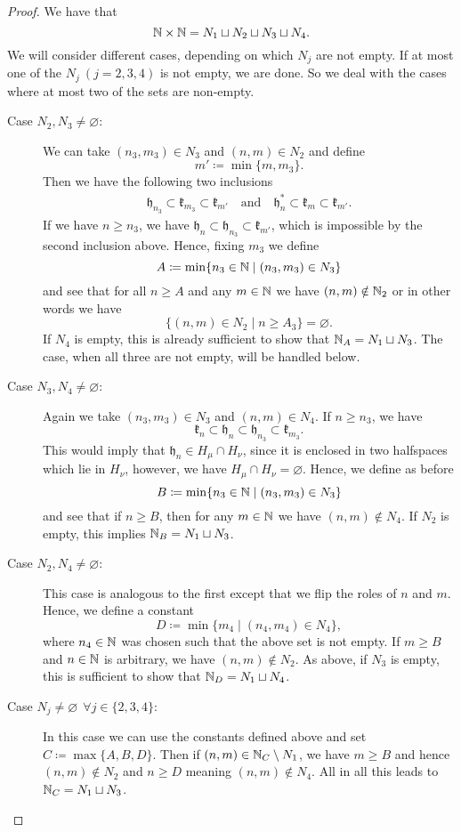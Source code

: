 \begin{proof}
  We have that
  \[
    \mathbb{N} \times \mathbb{N} = N_1 \sqcup N_2 \sqcup N_3 \sqcup N_4.
  \] 
  We will consider different cases, depending on which \(N_j\) are not empty. If at most one of the \(N_j\ (j = 2,3,4)\)  is not empty, we are done. So we deal with the cases where at most two of the sets are non-empty.
  \begin{description}
  \item[Case \(N_2, N_3 \neq \varnothing\):] We can take \((n_3, m_3) \in N_3\) and \((n,m) \in N_2\) and define
    \[
      m' \coloneqq \min\{m, m_3\}.
    \]
    Then we have the following two inclusions
    \begin{align*}
      \mathfrak{h}_{n_3} \subset \mathfrak{k}_{m_3} \subset \mathfrak{k}_{m'} \quad \text{and}\quad \mathfrak{h}_{n}^\ast \subset \mathfrak{k}_m \subset \mathfrak{k}_{m'}.
    \end{align*}
    If we have \(n \geq n_3\), we have \(\mathfrak{h}_n \subset \mathfrak{h}_{n_3} \subset \mathfrak{k}_{m'}\), which is impossible by the second inclusion above. Hence, fixing \(m_3\) we define
    \[
      A \coloneqq \min \{n_3 \in \mathbb{N} \mid (n_3, m_3) \in N_3\}
    \]
    and see that for all \(n \geq A\) and any \(m \in \mathbb{N}\) we have \((n,m) \notin \mathbb{N}_2\) or in other words we have
    \[
      \{(n,m) \in N_2 \mid n \geq A_3\} = \varnothing.
    \]
    If \(N_4\) is empty, this is already sufficient to show that \(\mathbb{N}_A = N_1 \sqcup N_3\). The case, when all three are not empty, will be handled below.
  \item[Case \(N_3,N_4 \neq \varnothing\):] Again we take \((n_3, m_3) \in N_3\) and \((n,m) \in N_4\). If \(n \geq n_3\), we have
    \[
      \mathfrak{k}_n \subset \mathfrak{h}_n \subset \mathfrak{h}_{n_3} \subset \mathfrak{k}_{m_3}.
    \]
    This would imply that \(\mathfrak{h}_n \in H_\mu \cap H_\nu\), since it is enclosed in two halfspaces which lie in \(H_\nu\), however, we have \(H_\mu \cap H_\nu = \varnothing\). Hence, we define as before
    \[
      B \coloneqq \min \{n_3 \in \mathbb{N} \mid (n_3, m_3) \in N_3\}
    \]
    and see that if \(n \geq B\), then for any \(m \in \mathbb{N}\) we have \((n,m) \notin N_4\). If \(N_2\) is empty, this implies \(\mathbb{N}_B = N_1 \sqcup N_3\).
  \item[Case \(N_2,N_4 \neq \varnothing\):] This case is analogous to the first except that we flip the roles of \(n\) and \(m\). Hence, we define a constant
    \[
      D \coloneqq \min \{m_4 \mid (n_4, m_4) \in N_4\},
    \]
    where \(n_4 \in \mathbb{N}\) was chosen such that the above set is not empty. If \(m \geq B\) and \(n \in \mathbb{N}\) is arbitrary, we have \((n, m) \notin N_2\). As above, if \(N_3 \) is empty, this is sufficient to show that \(\mathbb{N}_D = N_1 \sqcup N_4\).
  \item[Case \(N_j \neq \varnothing\ \ \forall j \in\{2,3,4\}\):] In this case we can use the constants defined above and set \(C \coloneqq \max \{A,B,D\}\). Then if \((n,m) \in \mathbb{N}_C \setminus N_1\), we have \(m \geq B\) and hence \((n,m) \notin N_2\) and \(n \geq D\) meaning \((n,m) \notin N_4\). All in all this leads to \(\mathbb{N}_C = N_1 \sqcup N_3\).
  \end{description}
\end{proof}

